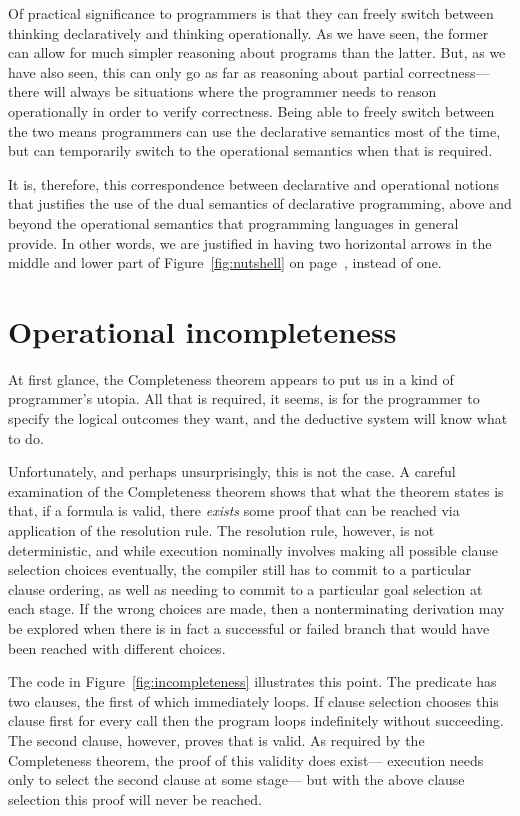 Of practical significance to programmers
is that they can freely switch between
thinking declaratively and thinking operationally.
As we have seen, the former can allow for
much simpler reasoning about programs than the latter.
But, as we have also seen,
this can only go as far as reasoning about partial correctness---%
there will always be situations where
the programmer needs to reason operationally in order to verify correctness.
Being able to freely switch between the two means programmers
can use the declarative semantics most of the time,
but can temporarily switch to the operational semantics when that is required.

It is, therefore,
this correspondence between declarative and operational notions
that justifies the use of the dual semantics of declarative programming,
above and beyond the operational semantics
that programming languages in general provide.
In other words,
we are justified in having two horizontal arrows
in the middle and lower part of Figure~\ref{fig:nutshell}
on page~\pageref{fig:nutshell},
instead of one.

\label{end:op-sem}


\section{Operational incompleteness}
\label{sec:incompleteness}

At first glance,
the Completeness theorem appears to put us in
a kind of programmer's utopia.
All that is required, it seems,
is for the programmer to specify the logical outcomes they want,
and the deductive system will know what to do.

Unfortunately, and perhaps unsurprisingly, this is not the case.
A careful examination of the Completeness theorem shows that
what the theorem states is that, if a formula is valid,
there \emph{exists} some proof that can be reached
via application of the resolution rule.
The resolution rule, however, is not deterministic,
and while execution nominally involves
making all possible clause selection choices eventually,
the compiler still has to commit to a particular clause ordering,
as well as needing to commit to a particular goal selection at each stage.
If the wrong choices are made,
then a nonterminating derivation may be explored
when there is in fact a successful or failed branch
that would have been reached with different choices.

The code in Figure~\ref{fig:incompleteness} illustrates this point.
The predicate  has two clauses,
the first of which immediately loops.
If clause selection chooses this clause first for every call
then the program loops indefinitely without succeeding.
The second clause, however, proves that  is valid.
As required by the Completeness theorem,
the proof of this validity does exist---%
execution needs only to select the second clause at some stage---%
but with the above clause selection this proof will never be reached.


